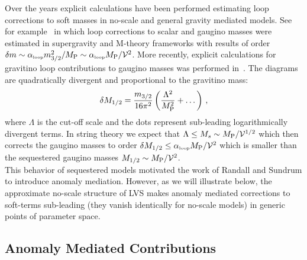 \documentclass[12pt,a4paper]{book}
\def\lp{{\scriptscriptstyle \rm loop}}
\begin{document}
Over the years explicit calculations have been performed estimating loop corrections to soft masses in no-scale
and general gravity mediated models. See for example~\cite{Ellis:1986nr,Antoniadis:1997ic} in which loop corrections to scalar and gaugino masses were estimated in supergravity and M-theory frameworks with results of order $\delta m \sim \alpha_\lp m_{3/2}^2/M_{\rm P}\sim \alpha_\lp M_{\rm P}/\mathcal{V}^2$. More recently, explicit calculations for gravitino loop contributions to gaugino masses was performed in~\cite{Lee:2013aia}. The diagrams are quadratically divergent and proportional to the gravitino mass:
\begin{align}
\delta M_{1/2} = \frac{m_{3/2}}{16\pi^2}\left(\frac{\Lambda^2}{M_{\rm P}^2}+\dots\right)\,,
\end{align}
where $\Lambda$ is the cut-off scale and the dots represent sub-leading logarithmically divergent terms. In string theory we expect that $\Lambda\leq M_s\sim M_{\rm P}/\mathcal{V}^{1/2}$ which then corrects the gaugino masses to order $\delta M_{1/2}\leq \alpha_\lp M_{\rm P}/\mathcal{V}^2$ which is smaller than the sequestered gaugino masses $M_{1/2}\sim M_{\rm P}/\mathcal{V}^2$.\\

This behavior of sequestered models motivated the work of Randall and Sundrum to introduce anomaly mediation.
However, as we will illustrate below, the approximate no-scale structure of LVS makes anomaly mediated corrections to soft-terms sub-leading (they vanish identically for no-scale models) in generic points of parameter space.

\subsection{Anomaly Mediated Contributions}
\label{anosec}
\end{document}
